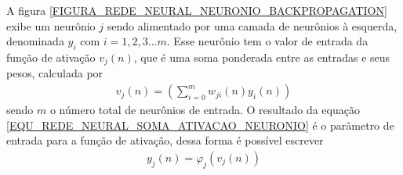 A figura \ref{FIGURA_REDE_NEURAL_NEURONIO_BACKPROPAGATION} exibe um neurônio \(j\) sendo alimentado por uma camada de neurônios à esquerda, denominada \(y_{i}\) com \(i = 1, 2, 3 \ldots m\). Esse neurônio tem o valor de entrada da função de ativação \(v_{j}(n)\), que é uma soma ponderada entre as entradas e seus pesos, calculada por
\begin{align}
v_{j}(n) = \left( \sum\limits_{i = 0}^{m} w_{ji}(n)y_{i}(n) \right)  \label{EQU_REDE_NEURAL_SOMA_ATIVACAO_NEURONIO}
\end{align}
sendo \(m\) o número total de neurônios de entrada. O resultado da equação \eqref{EQU_REDE_NEURAL_SOMA_ATIVACAO_NEURONIO} é o parâmetro de entrada para a função de ativação, dessa forma é possível escrever
\begin{align}
y_{j}(n) = \varphi_{j}(v_{j}(n)) \label{EQU_REDE_NEURAL_SAIDA_NEURONIO}
\end{align}

